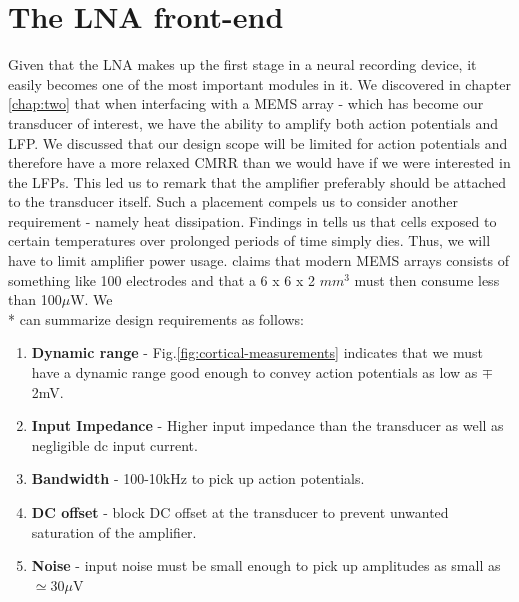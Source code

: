 \chapter{The LNA front-end}
Given that the \acl{LNA} makes up the first stage in a neural recording device, it easily becomes one of the most important modules in it.  We discovered in chapter \ref{chap:two} that when interfacing with a \acs{MEMS} array - which has become our transducer of interest, we have the ability to amplify both action potentials and \acs{LFP}. We discussed that our design scope will be limited for action potentials and therefore have a more relaxed CMRR than we would have if we were interested in the LFPs. This led us to remark that the amplifier preferably should be attached to the transducer itself. Such a placement compels us to consider another requirement - namely heat dissipation. Findings in  \cite{seese1998characterization} tells us that cells exposed to certain temperatures over prolonged periods of time simply dies. Thus, we will have to limit amplifier power usage.  \cite{harrison2008design} claims that modern \acs{MEMS} arrays consists of something like 100 electrodes and that a 6 x 6 x 2 $mm^3$ must then consume less than 100$\mu$W. We\\*
can summarize design requirements as follows:

\begin{enumerate}
  \item\textbf{Dynamic range} - Fig.\ref{fig:cortical-measurements} indicates that we must have a dynamic range good enough to convey action potentials as low as $\mp$2mV.
  \item\textbf{Input Impedance} - Higher input impedance than the transducer as well as negligible dc input current.
  \item\textbf{Bandwidth} - 100-10kHz to pick up action potentials.
  \item\textbf{DC offset} - block DC offset at the transducer to prevent unwanted saturation of the amplifier.
  \item\textbf{Noise} - input noise must be small enough to pick up amplitudes as small as $\simeq$30$\mu$V
\end{enumerate}
